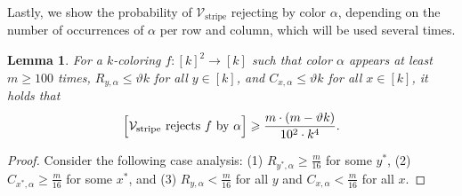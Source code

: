 \documentclass[11pt,fleqn]{article}
\renewcommand{\geq}{\geqslant}
\renewcommand{\leq}{\leqslant}
\renewcommand{\theta}{\vartheta}
\newcommand{\V}{\calV}
\newcommand{\f}{f}
\newcommand{\Vstripe}{\V_\mathrm{stripe}}
\newcommand{\calV}{\mathcal{V}}
\let\Pr\relax\DeclareMathOperator*{\Pr}{\mathbb{P}}
\newtheorem{lemma}[theorem]{Lemma}
\theoremstyle{definition}
\numberwithin{equation}{section}
\begin{document}
Lastly, we show the probability of $\Vstripe$ rejecting by color $\alpha$,
depending on the number of occurrences of $\alpha$ per row and column,
which will be used several times.

\begin{lemma}
\label{clm:Cut-hard:stripe:far:useful}
    For a $k$-coloring $\f \colon [k]^2 \to [k]$ such that
    color $\alpha$ appears at least $m \geq 100$ times,
    $R_{y,\alpha} \leq \theta k$ for all $y \in [k]$, and
    $C_{x,\alpha} \leq \theta k$ for all $x \in [k]$,
    it holds that
    \begin{align}
        \Pr\Bigl[ \Vstripe \text{ rejects } \f \text{ by } \alpha \Bigr]
        \geq \frac{m \cdot (m-\theta k)}{10^2 \cdot k^4}.
    \end{align}
\end{lemma}
\begin{proof}
Consider the following case analysis:
(1) $R_{y^*,\alpha} \geq \frac{m}{16}$ for some $y^*$,
(2) $C_{x^*,\alpha} \geq \frac{m}{16}$ for some $x^*$, and
(3) $R_{y,\alpha} < \frac{m}{16}$ for all $y$ and
    $C_{x,\alpha} < \frac{m}{16}$ for all $x$.



\end{proof}
\end{document}
